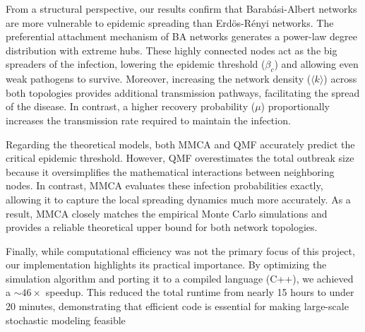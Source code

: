 \documentclass{article}
\begin{document}
From a structural perspective, our results confirm that Barabási-Albert networks are more vulnerable to epidemic spreading than Erdös-Rényi networks. The preferential attachment mechanism of BA networks generates a power-law degree distribution with extreme hubs. These highly connected nodes act as the big spreaders of the infection, lowering the epidemic threshold ($\beta_c$) and allowing even weak pathogens to survive. Moreover, increasing the network density ($\langle k \rangle$) across both topologies provides additional transmission pathways, facilitating the spread of the disease. In contrast, a higher recovery probability ($\mu$) proportionally increases the transmission rate required to maintain the infection.

Regarding the theoretical models, both MMCA and QMF accurately predict the critical epidemic threshold. However, QMF overestimates the total outbreak size because it oversimplifies the mathematical interactions between neighboring nodes. In contrast, MMCA evaluates these infection probabilities exactly, allowing it to capture the local spreading dynamics much more accurately. As a result, MMCA closely matches the empirical Monte Carlo simulations and provides a reliable theoretical upper bound for both network topologies.

Finally, while computational efficiency was not the primary focus of this project, our implementation highlights its practical importance. By optimizing the simulation algorithm and porting it to a compiled language (C++), we achieved a $\sim\!46\times$ speedup. This reduced the total runtime from nearly 15 hours to under 20 minutes, demonstrating that efficient code is essential for making large-scale stochastic modeling feasible



\newpage

\end{document}
